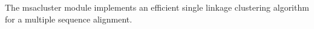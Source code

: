 The msacluster module implements an efficient single linkage
clustering algorithm for a multiple sequence alignment.


